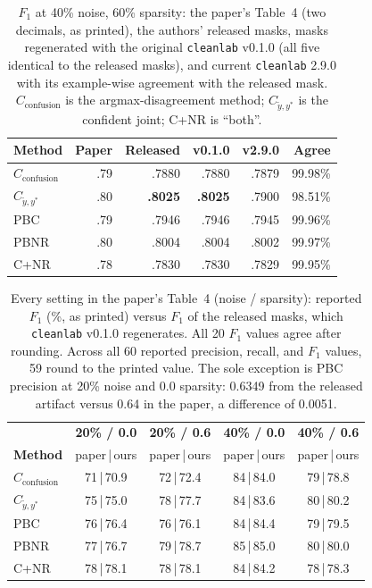 \documentclass[11pt]{article}
\newcommand{\cleanlab}{\texttt{cleanlab}}
\begin{document}
\begin{table}[t]
\centering
\small
\setlength{\tabcolsep}{3.8pt}
\setlength{\tabcolsep}{3pt}
\begin{tabular}{lrrrrr}
\toprule
\textbf{Method} & \textbf{Paper} & \textbf{Released} & \textbf{v0.1.0} & \textbf{v2.9.0} & \textbf{Agree} \\
\midrule
$C_{\text{confusion}}$ & .79 & .7880 & .7880 & .7879 & 99.98\% \\
$C_{\tilde{y},y^*}$ & .80 & \textbf{.8025} & \textbf{.8025} & .7900 & 98.51\% \\
PBC & .79 & .7946 & .7946 & .7945 & 99.96\% \\
PBNR & .80 & .8004 & .8004 & .8002 & 99.97\% \\
C+NR & .78 & .7830 & .7830 & .7829 & 99.95\% \\
\bottomrule
\end{tabular}
\caption{$F_1$ at 40\% noise, 60\% sparsity: the paper's Table~4 (two
decimals, as printed), the authors' released masks, masks regenerated with
the original \cleanlab{} v0.1.0 (all five identical to the released masks),
and current \cleanlab{} 2.9.0 with its example-wise agreement with the
released mask. $C_{\text{confusion}}$ is the argmax-disagreement method;
$C_{\tilde{y},y^*}$ is the confident joint; C+NR is ``both''.}
\label{tab:replication}
\end{table}

\begin{table}[t]
\centering
\small
\setlength{\tabcolsep}{5pt}
\begin{tabular}{lcccc}
\toprule
 & \textbf{20\% / 0.0} & \textbf{20\% / 0.6} & \textbf{40\% / 0.0} & \textbf{40\% / 0.6} \\
\textbf{Method} & paper\,|\,ours & paper\,|\,ours & paper\,|\,ours & paper\,|\,ours \\
\midrule
$C_{\text{confusion}}$ & 71\,|\,70.9 & 72\,|\,72.4 & 84\,|\,84.0 & 79\,|\,78.8 \\
$C_{\tilde{y},y^*}$ & 75\,|\,75.0 & 78\,|\,77.7 & 84\,|\,83.6 & 80\,|\,80.2 \\
PBC & 76\,|\,76.4 & 76\,|\,76.1 & 84\,|\,84.4 & 79\,|\,79.5 \\
PBNR & 77\,|\,76.7 & 79\,|\,78.7 & 85\,|\,85.0 & 80\,|\,80.0 \\
C+NR & 78\,|\,78.1 & 78\,|\,78.1 & 84\,|\,84.2 & 78\,|\,78.3 \\
\bottomrule
\end{tabular}
\caption{Every setting in the paper's Table~4 (noise / sparsity): reported
$F_1$ (\%, as printed) versus $F_1$ of the released masks,
which \cleanlab{} v0.1.0 regenerates. All 20 $F_1$ values agree after
rounding. Across all 60 reported precision, recall, and $F_1$ values, 59 round
to the printed value. The sole exception is PBC precision at 20\% noise and
0.0 sparsity: 0.6349 from the released artifact versus 0.64 in the paper, a
difference of 0.0051.}
\label{tab:paper-table4}
\end{table}
\end{document}
